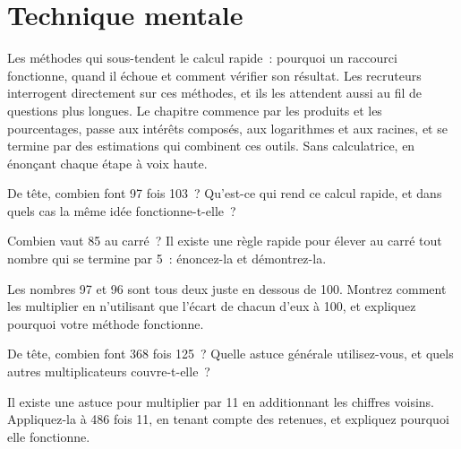 \chapter{Technique mentale}\label{ch:iv1:mental-technique}

\begin{ivtrains}
Les méthodes qui sous-tendent le calcul rapide~: pourquoi un raccourci fonctionne, quand il échoue et comment vérifier son résultat. Les recruteurs interrogent directement sur ces méthodes, et ils les attendent aussi au fil de questions plus longues. Le chapitre commence par les produits et les pourcentages, passe aux intérêts composés, aux logarithmes et aux racines, et se termine par des estimations qui combinent ces outils. Sans calculatrice, en énonçant chaque étape à voix haute.
\end{ivtrains}

\begin{question}\label{iq:iv1:mental-technique:1}
De tête, combien font 97 fois 103~? Qu'est-ce qui rend ce calcul rapide, et dans quels cas la même idée fonctionne-t-elle~?
\end{question}

\begin{question}\label{iq:iv1:mental-technique:2}
Combien vaut 85 au carré~? Il existe une règle rapide pour élever au carré tout nombre qui se termine par 5~: énoncez-la et démontrez-la.
\end{question}

\begin{question}\label{iq:iv1:mental-technique:3}
Les nombres 97 et 96 sont tous deux juste en dessous de 100. Montrez comment les multiplier en n'utilisant que l'écart de chacun d'eux à 100, et expliquez pourquoi votre méthode fonctionne.
\end{question}

\begin{question}\label{iq:iv1:mental-technique:4}
De tête, combien font 368 fois 125~? Quelle astuce générale utilisez-vous, et quels autres multiplicateurs couvre-t-elle~?
\end{question}

\begin{question}\label{iq:iv1:mental-technique:5}
Il existe une astuce pour multiplier par 11 en additionnant les chiffres voisins. Appliquez-la à 486 fois 11, en tenant compte des retenues, et expliquez pourquoi elle fonctionne.
\end{question}

